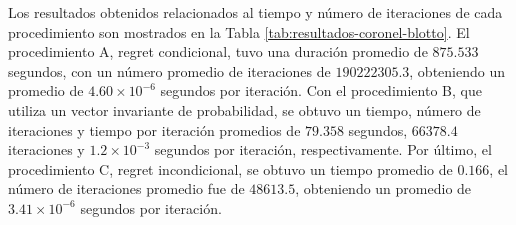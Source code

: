 Los resultados obtenidos relacionados al tiempo y número de iteraciones de cada procedimiento son mostrados en la Tabla \ref{tab:resultados-coronel-blotto}. El procedimiento A, regret condicional, tuvo una duración promedio de $875.533$ segundos, con un número promedio de iteraciones de $190222305.3$, obteniendo un promedio de $4.60 {\times} 10^{-6}$ segundos por iteración. Con el procedimiento B, que utiliza un vector invariante de probabilidad, se obtuvo un tiempo, número de iteraciones y tiempo por iteración promedios de $79.358$ segundos, $66378.4$ iteraciones y $1.2 {\times} 10^{-3}$ segundos por iteración, respectivamente. Por último, el procedimiento C, regret incondicional, se obtuvo un tiempo promedio de $0.166$, el número de iteraciones promedio fue de $48613.5$, obteniendo un promedio de $3.41 {\times} 10^{-6}$ segundos por iteración.

